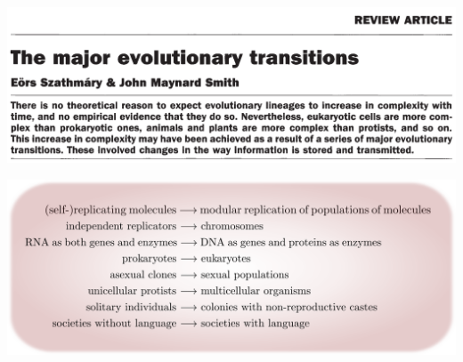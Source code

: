 \begin{frame}
\begin{center}
\includegraphics[width=0.8\framewidth]{fig/MajorEvolutionaryTransitions.png}

\includegraphics[width=0.8\framewidth]{fig/MajorTransitionsList.pdf}
\end{center}
\end{frame}